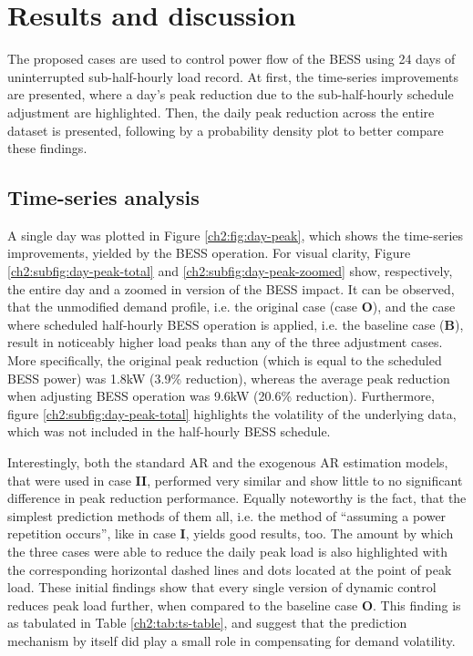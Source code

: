 \section{Results and discussion}
\label{ch2:sec:results}

The proposed cases are used to control power flow of the BESS using 24 days of uninterrupted sub-half-hourly load record.
At first, the time-series improvements are presented, where a day's peak reduction due to the sub-half-hourly schedule adjustment are highlighted.
Then, the daily peak reduction across the entire dataset is presented, following by a probability density plot to better compare these findings.

\subsection{Time-series analysis}



A single day was plotted in Figure \ref{ch2:fig:day-peak}, which shows the time-series improvements, yielded by the BESS operation.
For visual clarity, Figure \ref{ch2:subfig:day-peak-total} and \ref{ch2:subfig:day-peak-zoomed} show, respectively, the entire day and a zoomed in version of the BESS impact.
It can be observed, that the unmodified demand profile, i.e. the original case (case \textbf{O}), and the case where scheduled half-hourly BESS operation is applied, i.e. the  baseline case (\textbf{B}), result in noticeably higher load peaks than any of the three adjustment cases.
More specifically, the original peak reduction (which is equal to the scheduled BESS power) was 1.8kW (3.9\% reduction), whereas the average peak reduction when adjusting BESS operation was 9.6kW (20.6\% reduction).
Furthermore, figure \ref{ch2:subfig:day-peak-total} highlights the volatility of the underlying data, which was not included in the half-hourly BESS schedule.

Interestingly, both the standard AR and the exogenous AR estimation models, that were used in case \textbf{II}, performed very similar and show little to no significant difference in peak reduction performance.
Equally noteworthy is the fact, that the simplest prediction methods of them all, i.e. the method of ``assuming a power repetition occurs'', like in case \textbf{I}, yields good results, too.
The amount by which the three cases were able to reduce the daily peak load is also highlighted with the corresponding horizontal dashed lines and dots located at the point of peak load.
These initial findings show that every single version of dynamic control reduces peak load further, when compared to the baseline case \textbf{O}.
This finding is as tabulated in Table \ref{ch2:tab:ts-table}, and suggest that the prediction mechanism by itself did play a small role in compensating for demand volatility.

